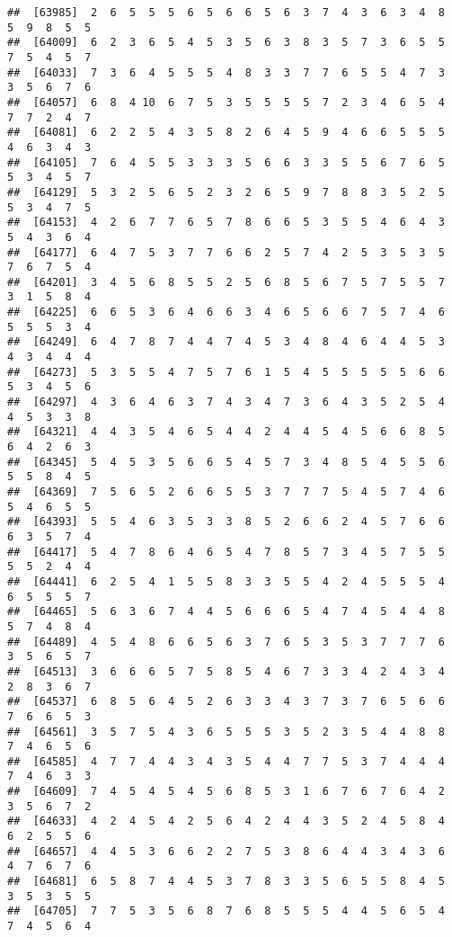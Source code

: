 \documentclass[
]{book}
\begin{document}
\begin{verbatim}
##  [63985]  2  6  5  5  5  6  5  6  6  5  6  3  7  4  3  6  3  4  8  5  9  8  5  5
##  [64009]  6  2  3  6  5  4  5  3  5  6  3  8  3  5  7  3  6  5  5  7  5  4  5  7
##  [64033]  7  3  6  4  5  5  5  4  8  3  3  7  7  6  5  5  4  7  3  3  5  6  7  6
##  [64057]  6  8  4 10  6  7  5  3  5  5  5  5  7  2  3  4  6  5  4  7  7  2  4  7
##  [64081]  6  2  2  5  4  3  5  8  2  6  4  5  9  4  6  6  5  5  5  4  6  3  4  3
##  [64105]  7  6  4  5  5  3  3  3  5  6  6  3  3  5  5  6  7  6  5  5  3  4  5  7
##  [64129]  5  3  2  5  6  5  2  3  2  6  5  9  7  8  8  3  5  2  5  5  3  4  7  5
##  [64153]  4  2  6  7  7  6  5  7  8  6  6  5  3  5  5  4  6  4  3  5  4  3  6  4
##  [64177]  6  4  7  5  3  7  7  6  6  2  5  7  4  2  5  3  5  3  5  7  6  7  5  4
##  [64201]  3  4  5  6  8  5  5  2  5  6  8  5  6  7  5  7  5  5  7  3  1  5  8  4
##  [64225]  6  6  5  3  6  4  6  6  3  4  6  5  6  6  7  5  7  4  6  5  5  5  3  4
##  [64249]  6  4  7  8  7  4  4  7  4  5  3  4  8  4  6  4  4  5  3  4  3  4  4  4
##  [64273]  5  3  5  5  4  7  5  7  6  1  5  4  5  5  5  5  5  6  6  5  3  4  5  6
##  [64297]  4  3  6  4  6  3  7  4  3  4  7  3  6  4  3  5  2  5  4  4  5  3  3  8
##  [64321]  4  4  3  5  4  6  5  4  4  2  4  4  5  4  5  6  6  8  5  6  4  2  6  3
##  [64345]  5  4  5  3  5  6  6  5  4  5  7  3  4  8  5  4  5  5  6  5  5  8  4  5
##  [64369]  7  5  6  5  2  6  6  5  5  3  7  7  7  5  4  5  7  4  6  5  4  6  5  5
##  [64393]  5  5  4  6  3  5  3  3  8  5  2  6  6  2  4  5  7  6  6  6  3  5  7  4
##  [64417]  5  4  7  8  6  4  6  5  4  7  8  5  7  3  4  5  7  5  5  5  5  2  4  4
##  [64441]  6  2  5  4  1  5  5  8  3  3  5  5  4  2  4  5  5  5  4  6  5  5  5  7
##  [64465]  5  6  3  6  7  4  4  5  6  6  6  5  4  7  4  5  4  4  8  5  7  4  8  4
##  [64489]  4  5  4  8  6  6  5  6  3  7  6  5  3  5  3  7  7  7  6  3  5  6  5  7
##  [64513]  3  6  6  6  5  7  5  8  5  4  6  7  3  3  4  2  4  3  4  2  8  3  6  7
##  [64537]  6  8  5  6  4  5  2  6  3  3  4  3  7  3  7  6  5  6  6  7  6  6  5  3
##  [64561]  3  5  7  5  4  3  6  5  5  5  3  5  2  3  5  4  4  8  8  7  4  6  5  6
##  [64585]  4  7  7  4  4  3  4  3  5  4  4  7  7  5  3  7  4  4  4  7  4  6  3  3
##  [64609]  7  4  5  4  5  4  5  6  8  5  3  1  6  7  6  7  6  4  2  3  5  6  7  2
##  [64633]  4  2  4  5  4  2  5  6  4  2  4  4  3  5  2  4  5  8  4  6  2  5  5  6
##  [64657]  4  4  5  3  6  6  2  2  7  5  3  8  6  4  4  3  4  3  6  4  7  6  7  6
##  [64681]  6  5  8  7  4  4  5  3  7  8  3  3  5  6  5  5  8  4  5  3  5  3  5  5
##  [64705]  7  7  5  3  5  6  8  7  6  8  5  5  5  4  4  5  6  5  4  7  4  5  6  4

\end{verbatim}
\end{document}
